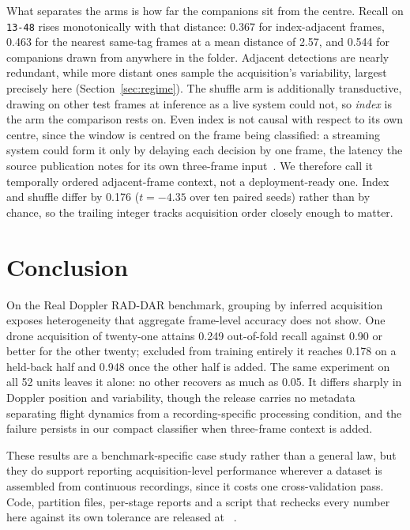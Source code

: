 \documentclass[conference]{IEEEtran}
\begin{document}
What separates the arms is how far the companions sit from the centre. Recall on \texttt{13-48} rises monotonically with that distance: 0.367 for index-adjacent frames, 0.463 for the nearest same-tag frames at a mean distance of 2.57, and 0.544 for companions drawn from anywhere in the folder. Adjacent detections are nearly redundant, while more distant ones sample the acquisition's variability, largest precisely here (Section~\ref{sec:regime}). The shuffle arm is additionally transductive, drawing on other test frames at inference as a live system could not, so \emph{index} is the arm the comparison rests on. Even index is not causal with respect to its own centre, since the window is centred on the frame being classified: a streaming system could form it only by delaying each decision by one frame, the latency the source publication notes for its own three-frame input~\cite{roldan2020}. We therefore call it temporally ordered adjacent-frame context, not a deployment-ready one. Index and shuffle differ by 0.176 ($t=-4.35$ over ten paired seeds) rather than by chance, so the trailing integer tracks acquisition order closely enough to matter.

\section{Conclusion}

On the Real Doppler RAD-DAR benchmark, grouping by inferred acquisition exposes heterogeneity that aggregate frame-level accuracy does not show. One drone acquisition of twenty-one attains 0.249 out-of-fold recall against 0.90 or better for the other twenty; excluded from training entirely it reaches 0.178 on a held-back half and 0.948 once the other half is added. The same experiment on all 52 units leaves it alone: no other recovers as much as 0.05. It differs sharply in Doppler position and variability, though the release carries no metadata separating flight dynamics from a recording-specific processing condition, and the failure persists in our compact classifier when three-frame context is added.

These results are a benchmark-specific case study rather than a general law, but they do support reporting acquisition-level performance wherever a dataset is assembled from continuous recordings, since it costs one cross-validation pass. Code, partition files, per-stage reports and a script that rechecks every number here against its own tolerance are released at \codeurl{}~\cite{dataset2026}.
\end{document}
